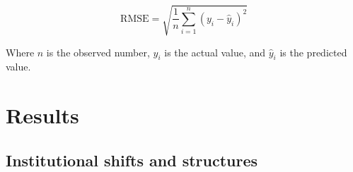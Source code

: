 \documentclass[preprint, 12pt]{elsarticle}
\begin{document}
\begin{equation}
    \label{ch5:eq:RMSE}
    \text{RMSE} = \sqrt{\frac{1}{n}\sum_{i=1}^{n}{(y_i-\hat{y}_i)}^2}
\end{equation}

Where $n$ is the observed number, $y_i$ is the actual value, and $\hat{y}_i$ is the predicted value.


\section{Results}\label{sec:results}

\subsection{Institutional shifts and structures}\label{results-1}
\end{document}

